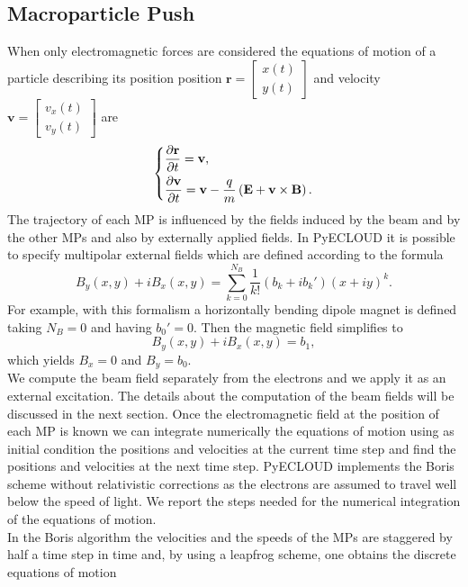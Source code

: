 \subsection{Macroparticle Push}
When only electromagnetic forces are considered the equations of motion of a particle describing its position position $\mathbf{r} = \begin{bmatrix} x(t)\\ y(t)\end{bmatrix}$ and velocity $\mathbf{v} = \begin{bmatrix} v_x(t)\\ v_y(t)\end{bmatrix}$ are
\begin{equation*}
    \begin{dcases}
        \frac{\partial \mathbf{r}}{\partial t} = \mathbf{v},\\
        \frac{\partial \mathbf{v}}{\partial t} = \mathbf{v} -\frac{q}{m}\left( \mathbf{E} + \mathbf{v}\times\mathbf{B} \right).
    \end{dcases}
\end{equation*}
The trajectory of each MP is influenced by the fields induced by the beam and by the other MPs and also by externally applied fields. In PyECLOUD it is possible to specify multipolar external fields which are defined according to the formula
\begin{equation*}
    B_y(x, y) + iB_x (x, y) = \sum_{k=0}^{N_B} \frac{1}{k!} (b_k + i b_k')(x+iy)^k.
\end{equation*}
For example, with this formalism a horizontally bending dipole magnet is defined taking $N_B = 0$ and having $b_0' = 0$. Then the magnetic field simplifies to
$$B_y(x, y) + iB_x(x, y) = b_1,$$
which yields $B_x = 0$ and $B_y = b_0$.\\
We compute the beam field separately from the electrons and we apply it as an external excitation. The details about the computation of the beam fields will be discussed in the next section.
Once the electromagnetic field at the position of each MP is known we can integrate numerically the equations of motion using as initial condition the positions and velocities at the current time step and find the positions and velocities at the next time step. PyECLOUD implements the Boris scheme without relativistic corrections as the electrons are assumed to travel well below the speed of light. We report the steps needed for the numerical integration of the equations of motion.\\
In the Boris algorithm the velocities and the speeds of the MPs are staggered by half a time step in time and, by using a leapfrog scheme, one obtains the discrete equations of motion
